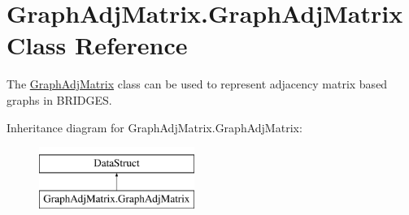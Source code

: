 \hypertarget{class_graph_adj_matrix_1_1_graph_adj_matrix}{}\section{Graph\+Adj\+Matrix.\+Graph\+Adj\+Matrix Class Reference}
\label{class_graph_adj_matrix_1_1_graph_adj_matrix}


The \hyperlink{class_graph_adj_matrix_1_1_graph_adj_matrix}{Graph\+Adj\+Matrix} class can be used to represent adjacency matrix based graphs in B\+R\+I\+D\+G\+ES.  


Inheritance diagram for Graph\+Adj\+Matrix.\+Graph\+Adj\+Matrix\+:\begin{figure}[H]
\begin{center}
\leavevmode
\includegraphics[height=2.000000cm]{class_graph_adj_matrix_1_1_graph_adj_matrix}
\end{center}
\end{figure}
